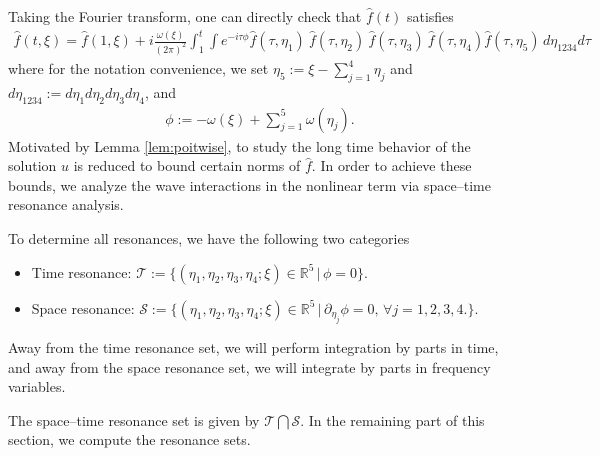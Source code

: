 \documentclass[reqno,english,11pt]{amsart}
\theoremstyle{definition}
\numberwithin{equation}{section}
\begin{document}
Taking the Fourier transform, one can directly check that $\hat{f}(t)$ satisfies
\begin{align}\label{eq:f_duhamel}
  \widehat{f}(t,\xi) =  \widehat{f}(1,\xi) 
+i\frac{\omega(\xi)}{\left(2\pi\right)^{2}}
    \int_{1}^{t}\int  e^{-i\tau\phi}  
    \hat{f}(\tau,\eta_{1})\ \hat{f}(\tau,\eta_{2})\ \hat{f}(\tau,\eta_{3})\ \hat{f}(\tau,\eta_4) \hat{f}\left(\tau,\eta_{5}\right)\,d\eta_{1234}  d \tau
\end{align}
where for the notation convenience, we set $\eta_5:=\xi-\sum^4_{j=1}\eta_j$ and $d\eta_{1234}:=d\eta_1d\eta_2d\eta_3d\eta_4$,  and 
\begin{align}
    \phi:=-\omega(\xi)+\sum^5_{j=1}\omega(\eta_j).
\end{align}
Motivated by Lemma \ref{lem:poitwise}, to study the long time behavior of the solution $u$ is reduced to bound certain norms of $\hat{f}$. In order to achieve these bounds, we analyze the wave interactions in the nonlinear term via space--time resonance analysis.

To determine all resonances, we have the following two categories
\begin{itemize}
    \item Time resonance: $\mathcal{T}:=\{(\eta_1,\eta_2,\eta_3, \eta_4; \xi)\in \mathbb{R}^5\,|\,\phi=0\}.$
   \item  Space resonance: $\mathcal{S}:=\{(\eta_1,\eta_2,\eta_3, \eta_4; \xi)\in \mathbb{R}^5\,|\,\partial_{\eta_j}\phi=0, \, \forall j=1,2,3,4.\}.$
\end{itemize}
Away from the time resonance set, we will perform integration by parts in time, and  away from the space resonance set, we will integrate by parts in frequency variables.

The space--time resonance set is given by $\mathcal{T}\bigcap \mathcal{S}$. In the remaining part of this section, we compute the resonance sets. 
\end{document}
